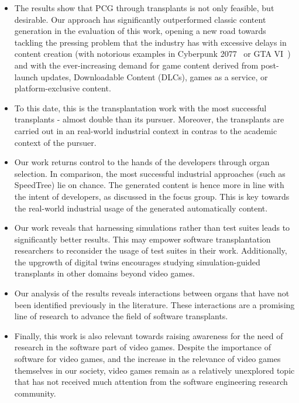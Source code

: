 \begin{itemize}
    
    \item The results show that PCG through transplants is not only feasible, but desirable. Our approach has significantly outperformed classic content generation in the evaluation of this work, opening a new road towards tackling the pressing problem that the industry has with excessive delays in content creation (with notorious examples in Cyberpunk 2077~\cite{cyberpunk2077} or GTA VI~\cite{gta6}) and with the ever-increasing demand for game content derived from post-launch updates, Downloadable Content (DLCs), games as a service, or platform-exclusive content.
    
    \item To this date, this is the transplantation work with the most successful transplants - almost double than its pursuer. Moreover, the transplants are carried out in an real-world industrial context in contras to the academic context of the pursuer.
    
    \item Our work returns control to the hands of the developers through organ selection. In comparison, the most successful industrial approaches (such as SpeedTree) lie on chance. The generated content is hence more in line with the intent of developers, as discussed in the focus group. This is key towards the real-world industrial usage of the generated automatically content.
    
    \item Our work reveals that harnessing simulations rather than test suites leads to significantly better results. This may empower software transplantation researchers to reconsider the usage of test suites in their work. Additionally, the upgrowth of digital twins encourages studying simulation-guided transplants in other domains beyond video games.

    \item Our analysis of the results reveals interactions between organs that have not been identified previously in the literature. These interactions are a promising line of research to advance the field of software transplants.
    
    \item Finally, this work is also relevant towards raising awareness for the need of research in the software part of video games. Despite the importance of software for video games, and the increase in the relevance of video games themselves in our society, video games remain as a relatively unexplored topic that has not received much attention from the software engineering research community.
    
\end{itemize}

